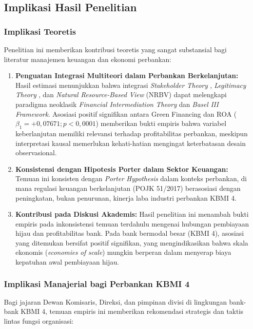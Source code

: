 \documentclass[12pt,a4paper]{article}
\numberwithin{equation}{section}
\begin{document}
\subsection{Implikasi Hasil Penelitian}

\subsubsection{Implikasi Teoretis}
\noindent
Penelitian ini memberikan kontribusi teoretis yang sangat substansial bagi literatur manajemen keuangan dan ekonomi perbankan:
\begin{enumerate}
  \item \textbf{Penguatan Integrasi Multiteori dalam Perbankan Berkelanjutan:} Hasil estimasi menunjukkan bahwa integrasi \emph{Stakeholder Theory} \citep{Freeman2010}, \emph{Legitimacy Theory} \citep{Suchman1995}, dan \emph{Natural Resource-Based View} (NRBV) \citep{Hart1995} dapat melengkapi paradigma neoklasik \emph{Financial Intermediation Theory} \citep{Diamond1984} dan \emph{Basel III Framework}. Asosiasi positif signifikan antara Green Financing dan ROA ($\beta_1 = +0{,}07671; p < 0{,}0001$) memberikan bukti empiris bahwa variabel keberlanjutan memiliki relevansi terhadap profitabilitas perbankan, meskipun interpretasi kausal memerlukan kehati-hatian mengingat keterbatasan desain observasional.
  \item \textbf{Konsistensi dengan Hipotesis Porter dalam Sektor Keuangan:} Temuan ini konsisten dengan \emph{Porter Hypothesis} dalam konteks perbankan, di mana regulasi keuangan berkelanjutan (POJK 51/2017) berasosiasi dengan peningkatan, bukan penurunan, kinerja laba industri perbankan KBMI 4.
  \item \textbf{Kontribusi pada Diskusi Akademis:} Hasil penelitian ini menambah bukti empiris pada inkonsistensi temuan terdahulu mengenai hubungan pembiayaan hijau dan profitabilitas bank. Pada bank bermodal besar (KBMI 4), asosiasi yang ditemukan bersifat positif signifikan, yang mengindikasikan bahwa skala ekonomis (\emph{economies of scale}) mungkin berperan dalam menyerap biaya kepatuhan awal pembiayaan hijau.
\end{enumerate}

\subsubsection{Implikasi Manajerial bagi Perbankan KBMI 4}
\noindent
Bagi jajaran Dewan Komisaris, Direksi, dan pimpinan divisi di lingkungan bank-bank KBMI 4, temuan empiris ini memberikan rekomendasi strategis dan taktis lintas fungsi organisasi:
\end{document}
